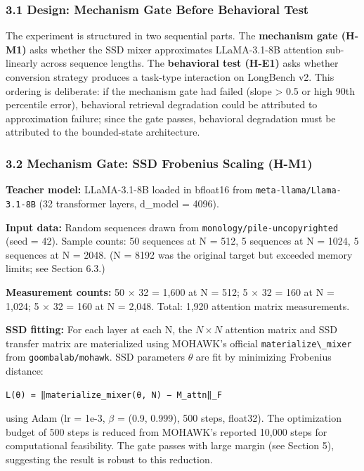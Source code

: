 
\subsubsection{3.1 Design: Mechanism Gate Before Behavioral Test}

The experiment is structured in two sequential parts. The \textbf{mechanism gate (H-M1)} asks whether the SSD mixer approximates LLaMA-3.1-8B attention sub-linearly across sequence lengths. The \textbf{behavioral test (H-E1)} asks whether conversion strategy produces a task-type interaction on LongBench v2. This ordering is deliberate: if the mechanism gate had failed (slope > 0.5 or high 90th percentile error), behavioral retrieval degradation could be attributed to approximation failure; since the gate passes, behavioral degradation must be attributed to the bounded-state architecture.

\subsubsection{3.2 Mechanism Gate: SSD Frobenius Scaling (H-M1)}

\textbf{Teacher model:} LLaMA-3.1-8B loaded in bfloat16 from \texttt{meta-llama/Llama-3.1-8B} (32 transformer layers, d\_model = 4096).

\textbf{Input data:} Random sequences drawn from \texttt{monology/pile-uncopyrighted} (seed = 42). Sample counts: 50 sequences at N = 512, 5 sequences at N = 1024, 5 sequences at N = 2048. (N = 8192 was the original target but exceeded memory limits; see Section 6.3.)

\textbf{Measurement counts:} 50 $\times$ 32 = 1,600 at N = 512; 5 $\times$ 32 = 160 at N = 1,024; 5 $\times$ 32 = 160 at N = 2,048. Total: 1,920 attention matrix measurements.

\textbf{SSD fitting:} For each layer at each N, the $N\times N$ attention matrix and SSD transfer matrix are materialized using MOHAWK's official \texttt{materialize\textbackslash \_mixer} from \texttt{goombalab/mohawk}. SSD parameters $\theta$ are fit by minimizing Frobenius distance:

\begin{verbatim}
L(θ) = ‖materialize_mixer(θ, N) − M_attn‖_F
\end{verbatim}

using Adam (lr = 1e-3, $\beta$ = (0.9, 0.999), 500 steps, float32). The optimization budget of 500 steps is reduced from MOHAWK's reported 10,000 steps for computational feasibility. The gate passes with large margin (see Section 5), suggesting the result is robust to this reduction.


